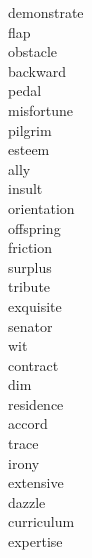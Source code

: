 \documentclass[a4paper, 11pt]{ctexart}
\begin{document}
\begin{multicols*}{3}
\begin{description}
\item[demonstrate]

\item[flap]

\item[obstacle]

\item[backward]

\item[pedal]

\item[misfortune]

\item[pilgrim]

\item[esteem]

\item[ally]

\item[insult]

\item[orientation]

\item[offspring]

\item[friction]

\item[surplus]

\item[tribute]

\item[exquisite]

\item[senator]

\item[wit]

\item[contract]

\item[dim]

\item[residence]

\item[accord]

\item[trace]

\item[irony]

\item[extensive]

\item[dazzle]

\item[curriculum]

\item[expertise]


\end{description}
\end{multicols*}
\end{document}
